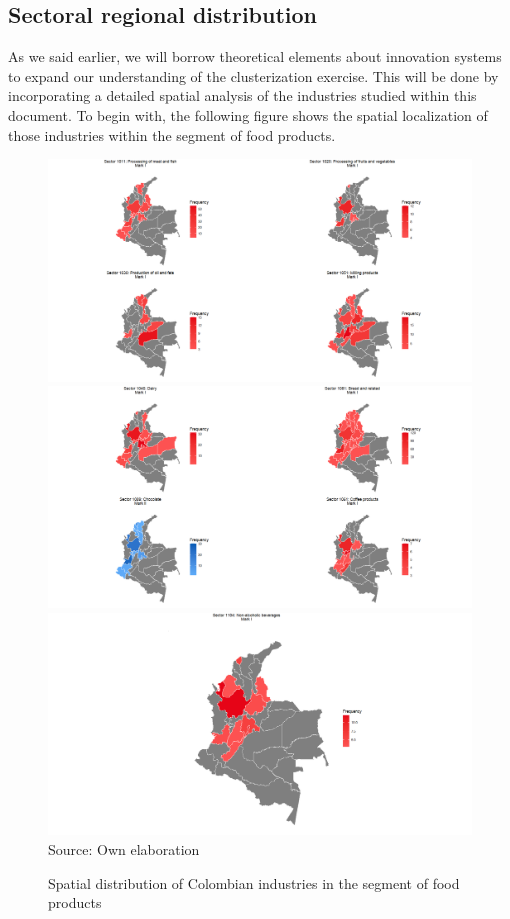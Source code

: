 \documentclass[12pt,a4paper]{article}
\begin{document}
\subsection{Sectoral regional distribution}

As we said earlier, we will borrow theoretical elements about innovation systems to expand our understanding of the clusterization exercise. This will be done by incorporating a detailed spatial analysis of the industries studied within this document. To begin with, the following figure shows the spatial localization of those industries within the segment of food products.

\begin{figure}
	\caption{Spatial distribution of Colombian industries in the segment of food products}
	\centering
	\includegraphics[scale=0.4]{fp1} \\
	\includegraphics[scale=0.4]{fp2}
	\includegraphics[scale=0.25]{sodas} \\
	Source: Own elaboration
\end{figure}
\end{document}
